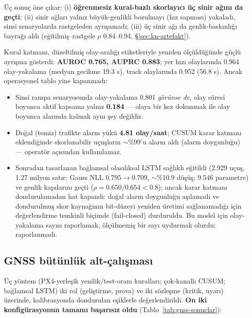 \documentclass[11pt,a4paper]{article}
\begin{document}
Üç sonuç öne çıkar: (i) \textbf{öğrenmesiz kural-bazlı skorlayıcı üç sinir ağını
da geçti}; (ii) sinir ağları yalnız büyük-genlikli bozulmayı (hız sapması)
yakaladı, sinsi senaryolarda rastgeleden ayrışamadı; (iii) üç sinir ağı da
genlik-baskınlığı bayrağı aldı (eğitilmiş--rastgele $\rho$ 0.84--0.94,
\S\ref{sec:kn-artefakt}).

Kural katmanı, düzeltilmiş olay-aralığı etiketleriyle yeniden ölçüldüğünde
güçlü ayrışma gösterdi: \textbf{AUROC 0.765, AUPRC 0.883}; yer hızı olaylarında
0.964 olay-yakalama (medyan gecikme 19.3 s), track olaylarında 0.952 (56.8 s).
Ancak operasyonel tablo yine kapanmadı:

\begin{itemize}[itemsep=2pt]
  \item Sinsi rampa senaryosunda olay-yakalama 0.801 \emph{görünse de}, olay
        süresi boyunca aktif kapsama yalnız \textbf{0.184} --- olaya bir kez
        dokunmak ile olay boyunca alarmda kalmak aynı şey değildir.
  \item Doğal (temiz) trafikte alarm yükü \textbf{4.81 olay/saat}; CUSUM karar
        katmanı eklendiğinde skorlanabilir uçuşların $\sim$\%99'u alarm aldı
        (alarm doygunluğu) --- operatör açısından kullanılamaz.
  \item Sonradan tasarlanan bağlamsal olasılıksal LSTM sağlıklı eğitildi (2.929
        uçuş, 1.27 milyon satır; Gauss NLL $0.795 \to 0.709$, $\sim$\%10.9
        düşüş; 9.546 parametre) ve genlik kapılarını geçti
        ($\rho = 0.650/0.654 < 0.8$); ancak karar katmanı dondurulamadan hat
        kapandı: doğal alarm doygunluğu aşılamadı ve dondurulmuş skor
        kaynağının bit-düzeyi yeniden üretimi sağlanamadığı için değerlendirme
        temkinli biçimde (fail-closed) durduruldu. Bu model için olay-yakalama
        sayısı raporlamak, ölçülmemiş bir sayı uydurmak olurdu; raporlanmadı.
\end{itemize}

\subsection{GNSS bütünlük alt-çalışması}
\label{sec:gnss-sonuc}

Üç yöntem (PX4-yerleşik yenilik/test-oranı kuralları; çok-kanallı CUSUM;
bağlamsal LSTM) iki rol (geliştirme, prova) ve iki sözleşme (kritik, uyarı)
üzerinde, kalibrasyonda dondurulan eşiklerle değerlendirildi. \textbf{On iki
konfigürasyonun tamamı başarısız oldu} (Tablo~\ref{tab:gnss-sonuclar}):
\end{document}
